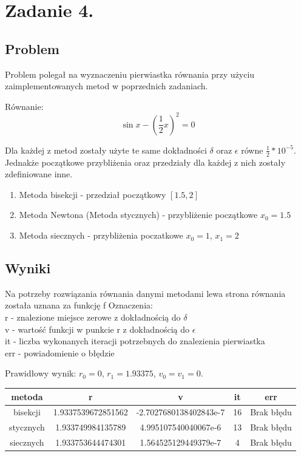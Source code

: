 \documentclass[11pt, a4paper]{article}
\begin{document}
    \section{Zadanie 4.}
    \subsection{Problem}
    Problem polegał na wyznaczeniu pierwiastka równania przy użyciu zaimplementowanych metod w poprzednich zadaniach.
    
    Równanie:
    \[\sin{x} - (\frac{1}{2}x)^{2} = 0 \]

    Dla każdej z metod zostały użyte te same dokładności $\delta$ oraz $\epsilon$ równe $\frac{1}{2} * 10^{-5}$.\\
    Jednakże początkowe przybliżenia oraz przedziały dla każdej z nich zostały zdefiniowane inne.
    \begin{enumerate}
        \item Metoda bisekcji - przedział początkowy $[1.5, 2]$
        \item Metoda Newtona (Metoda stycznych) - przybliżenie początkowe $x_{0} = 1.5$
        \item Metoda siecznych - przybliżenia poczatkowe $x_{0} = 1$, $x_{1} = 2$
    \end{enumerate}
    \subsection{Wyniki}
    Na potrzeby rozwiązania równania danymi metodami lewa strona równania została uznana za funkcję f
    Oznaczenia:\\
    r - znalezione miejsce zerowe z dokładnością do $\delta$ \\
    v - wartość funkcji w punkcie r z dokładnością do $\epsilon$ \\
    it - liczba wykonanych iteracji potrzebnych do znalezienia pierwiastka \\
    err - powiadomienie o błędzie

    Prawidłowy wynik: $r_{0} = 0$, $r_{1} = 1.93375$, $v_{0} = v_{1} = 0$.
    \begin{center}
        \begin{tabular}{c|c|c|c|c}
            metoda & r & v & it & err\\
            \hline
            bisekcji & 1.9337539672851562 & -2.7027680138402843e-7 & 16 & Brak błędu\\
            stycznych & 1.933749984135789 & 4.995107540040067e-6 & 13 & Brak błędu\\
            siecznych & 1.933753644474301 & 1.564525129449379e-7 & 4 & Brak błędu\\
        \end{tabular}
    \end{center}
\end{document}
